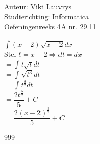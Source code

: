 \documentclass[a4paper]{article}
\begin{document}
  
\noindent \large Auteur: Viki	Lauvrys \\
\noindent \large Studierichting: Informatica\\
\noindent \large Oefeningenreeks 4A nr. 29.11\\

\medskip

\normalsize

$ \displaystyle\int (x-2)\sqrt{x-2} dx $ \\

Stel $ t = x-2 \Rightarrow dt = dx $ \\

$ = \displaystyle\int t\sqrt{t} dt $ \\

$ = \displaystyle\int \sqrt{t^3} dt $ \\

$ = \displaystyle\int t^{\tfrac{3}{2}} dt $ \\

$ = \dfrac{2t^{\tfrac{5}{2}}}{5} +C $ \\

$ = \dfrac{2(x-2)^{\tfrac{5}{2}}}{5} +C $ \\


\begin{thebibliography}{999}
\end{thebibliography}
\end{document}
